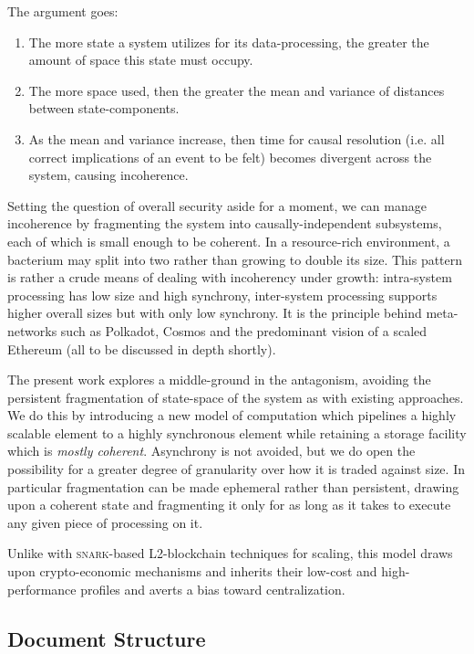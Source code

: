 The argument goes:
\begin{enumerate}
  \item The more state a system utilizes for its data-processing, the greater the amount of space this state must occupy.
  \item The more space used, then the greater the mean and variance of distances between state-components.
  \item As the mean and variance increase, then time for causal resolution (i.e. all correct implications of an event to be felt) becomes divergent across the system, causing incoherence.
\end{enumerate}

Setting the question of overall security aside for a moment, we can manage incoherence by fragmenting the system into causally-independent subsystems, each of which is small enough to be coherent. In a resource-rich environment, a bacterium may split into two rather than growing to double its size. This pattern is rather a crude means of dealing with incoherency under growth: intra-system processing has low size and high synchrony, inter-system processing supports higher overall sizes but with only low synchrony. It is the principle behind meta-networks such as Polkadot, Cosmos and the predominant vision of a scaled Ethereum (all to be discussed in depth shortly).

The present work explores a middle-ground in the antagonism, avoiding the persistent fragmentation of state-space of the system as with existing approaches. We do this by introducing a new model of computation which pipelines a highly scalable element to a highly synchronous element while retaining a storage facility which is \emph{mostly coherent}. Asynchrony is not avoided, but we do open the possibility for a greater degree of granularity over how it is traded against size. In particular fragmentation can be made ephemeral rather than persistent, drawing upon a coherent state and fragmenting it only for as long as it takes to execute any given piece of processing on it.

Unlike with \textsc{snark}-based L2-blockchain techniques for scaling, this model draws upon crypto-economic mechanisms and inherits their low-cost and high-performance profiles and averts a bias toward centralization.

\subsection{Document Structure}

